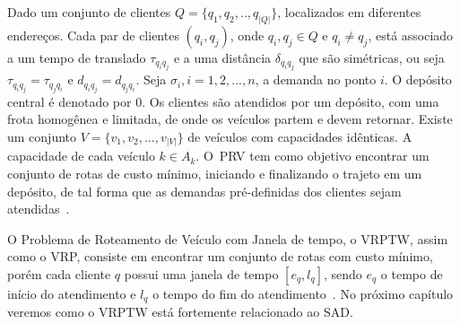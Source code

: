 Dado um conjunto de clientes $Q = \{q_1, q_2, .., q_|Q|\}$, localizados em diferentes endereços. Cada par de clientes $(q_i, q_j)$, onde $q_i, q_j \in Q$ e $q_i \neq q_j$, está associado a um tempo de translado $\tau_{q_iq_j}$ e a uma distância $\delta_{q_iq_j}$ que são simétricas, ou seja $\tau_{q_iq_j} = \tau_{q_jq_i}$ e $d_{q_iq_j} = d_{q_jq_i}$. Seja $\sigma_i , i =1, 2,...,n$, a demanda no ponto $i$. O depósito central é denotado por 0. Os clientes são atendidos por um depósito, com uma frota homogênea e limitada, de onde os veículos partem e devem retornar. Existe um conjunto $V = \{v_1,v_2,...,v_|V|\}$ de veículos com capacidades idênticas. A capacidade de cada veículo $k\in A_k$. O~\ac{PRV} tem como objetivo encontrar um conjunto de rotas de custo mínimo, iniciando e finalizando o trajeto em um depósito, de tal forma que as demandas pré-definidas dos clientes sejam atendidas~\cite{gold:2008}.

O Problema de Roteamento de Veículo com Janela de tempo, o \ac{VRPTW}, assim como o \ac{VRP}, consiste em encontrar um conjunto de rotas com custo mínimo, porém cada cliente $q$ possui uma janela de tempo $[e_{q}, l_{q}]$, sendo $e_{q}$ o tempo de início do atendimento e $l_{q}$ o tempo do fim do atendimento~\cite{gold:2008}. No próximo capítulo veremos como o \ac{VRPTW} está fortemente relacionado ao \ac{SAD}.